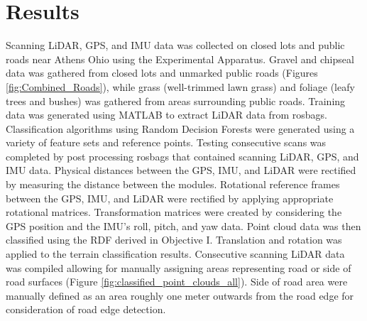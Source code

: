 \documentclass[journal,onecolumn]{IEEEtran}
\begin{document}
	
\section{Results}
	
	{Scanning LiDAR, GPS, and IMU data was collected on closed lots and public roads near Athens Ohio using the Experimental Apparatus. Gravel and chipseal data was gathered from closed lots and unmarked public roads (Figures \ref{fig:Combined_Roads}), while grass (well-trimmed lawn grass) and foliage (leafy trees and bushes) was gathered from areas surrounding public roads. Training data was generated using MATLAB to extract LiDAR data from rosbags. Classification algorithms using Random Decision Forests were generated using a variety of feature sets and reference points. Testing consecutive scans was completed by post processing rosbags that contained scanning LiDAR, GPS, and IMU data. Physical distances between the GPS, IMU, and LiDAR were rectified by measuring the distance between the modules. Rotational reference frames between the GPS, IMU, and LiDAR were rectified by applying appropriate rotational matrices. Transformation matrices were created by considering the GPS position and the IMU's roll, pitch, and yaw data. Point cloud data was then classified using the RDF derived in Objective I. Translation and rotation was applied to the terrain classification results. Consecutive scanning LiDAR data was compiled allowing for manually assigning areas representing road or side of road surfaces (Figure \ref{fig:classified_point_clouds_all}). Side of road area were manually defined as an area roughly one meter outwards from the road edge for consideration of road edge detection.}
		
\end{document}
